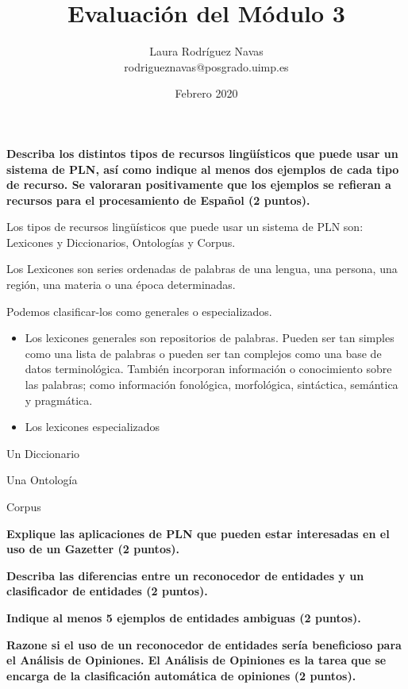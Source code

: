 \documentclass[11pt]{exam}
\title{Evaluación del Módulo 3}
\author{Laura Rodríguez Navas \\ rodrigueznavas@posgrado.uimp.es}
\date{Febrero 2020}
\begin{document}
\maketitle

\begin{questions}
	
{\bf \question Describa los distintos tipos de recursos lingüísticos que puede usar un sistema de PLN, así como indique al menos dos ejemplos de cada tipo de recurso. Se valoraran positivamente que los ejemplos se refieran a recursos para el procesamiento de  Español (2 puntos).}

Los tipos de recursos lingüísticos que puede usar un sistema de PLN son: Lexicones y Diccionarios, Ontologías y Corpus.

Los Lexicones son series ordenadas de palabras de una lengua, una persona, una región, una materia o una época determinadas. 

Podemos clasificar-los como generales o especializados.

\begin{itemize}
	\item Los lexicones generales son repositorios de palabras. Pueden ser tan simples como una lista de palabras o pueden ser tan complejos como una base de datos terminológica. También incorporan información o conocimiento sobre las palabras; como información fonológica, morfológica, sintáctica, semántica y pragmática.
	\item Los lexicones especializados
\end{itemize}

Un Diccionario

Una Ontología

Corpus

{\bf \question Explique las aplicaciones de PLN que pueden estar interesadas en el uso de un Gazetter (2 puntos).}

{\bf \question Describa las diferencias entre un reconocedor de entidades y un clasificador de entidades (2 puntos).}

{\bf \question Indique al menos 5 ejemplos de entidades ambiguas (2 puntos).}

{\bf \question Razone si el uso de un reconocedor de entidades sería beneficioso para el Análisis de Opiniones. El Análisis de Opiniones es la tarea que se encarga de la clasificación automática de opiniones (2 puntos).}

\end{questions}
\end{document}

